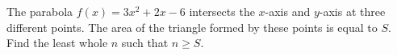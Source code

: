 The parabola ${f(x)=3x^{2}+2x-6}$ intersects the $x$-axis and $y$-axis at three different points. The area of the triangle formed by these points is equal to $S$. Find the least whole $n$ such that $n\geq S$.
